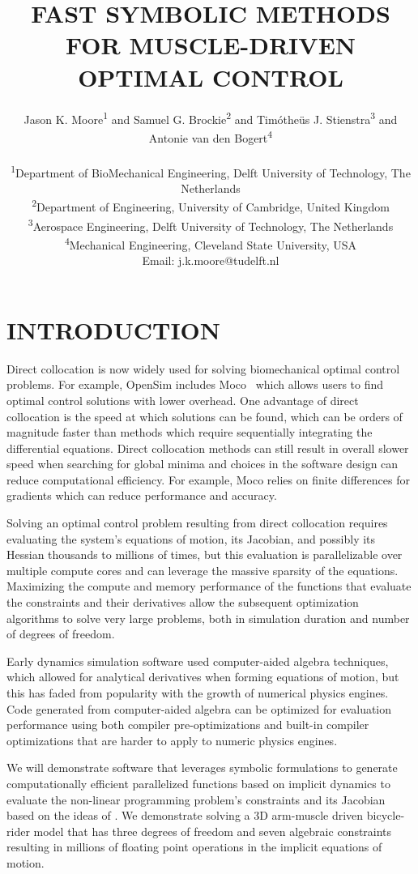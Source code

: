 \documentclass[11pt,twocolumn]{article}
\title{\normalsize\textbf{
  FAST SYMBOLIC METHODS FOR MUSCLE-DRIVEN OPTIMAL CONTROL
}}
\author{
Jason K. Moore\textsuperscript{1} and
Samuel G. Brockie\textsuperscript{2} and
Timótheüs J. Stienstra\textsuperscript{3} and
Antonie van den Bogert\textsuperscript{4} \\
\\
\small
\textsuperscript{1}Department of BioMechanical Engineering, Delft University of Technology, The Netherlands\\
\small
\textsuperscript{2}Department of Engineering, University of Cambridge, United Kingdom\\
\small
\textsuperscript{3}Aerospace Engineering, Delft University of Technology, The Netherlands\\
\small
\textsuperscript{4}Mechanical Engineering, Cleveland State University, USA\\
\small
Email: j.k.moore@tudelft.nl}
\date{}
\begin{document}
\pagestyle{fancy}
\lhead{}
\fancyfoot{}
\maketitle
\section*{INTRODUCTION}
\vspace{-1em}
%
Direct collocation is now widely used for solving biomechanical optimal control
problems. For example, OpenSim includes Moco~\cite{Dembia2020} which allows
users to find optimal control solutions with lower overhead. One advantage of
direct collocation is the speed at which solutions can be found, which can be
orders of magnitude faster than methods which require sequentially integrating
the differential equations. Direct collocation methods can still result in
overall slower speed when searching for global minima and choices in the
software design can reduce computational efficiency. For example, Moco relies on
finite differences for gradients which can reduce performance and accuracy.

Solving an optimal control problem resulting from direct collocation requires
evaluating the system's equations of motion, its Jacobian, and possibly its
Hessian thousands to millions of times, but this evaluation is parallelizable
over multiple compute cores and can leverage the massive sparsity of the
equations. Maximizing the compute and memory performance of the functions that
evaluate the constraints and their derivatives allow the subsequent
optimization algorithms to solve very large problems, both in simulation
duration and number of degrees of freedom.

Early dynamics simulation software used computer-aided algebra techniques, which
allowed for analytical derivatives when forming equations of motion, but this
has faded from popularity with the growth of numerical physics engines. Code
generated from computer-aided algebra can be optimized for evaluation
performance using both compiler pre-optimizations and built-in compiler
optimizations that are harder to apply to numeric physics engines.

We will demonstrate software that leverages symbolic formulations to generate
computationally efficient parallelized functions based on implicit dynamics to
evaluate the non-linear programming problem's constraints and its Jacobian based
on the ideas of \cite{vandenBogert2011a}. We demonstrate solving a 3D arm-muscle
driven bicycle-rider model that has three degrees of freedom and seven algebraic
constraints resulting in millions of floating point operations in the implicit
equations of motion.
\end{document}
